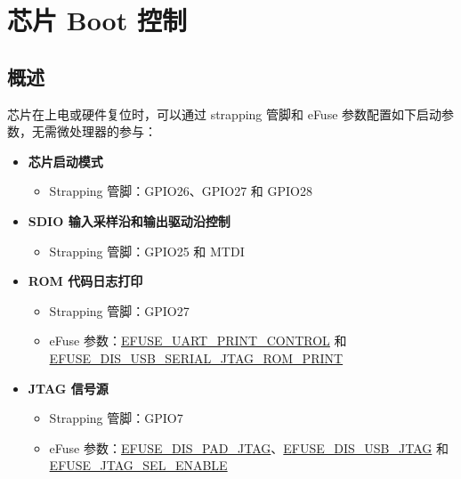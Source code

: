 \documentclass[main\_\_CN.tex]{subfiles}
\begin{document}

\ifglobal
\else
    \listoftodos
    {\let\clearpage\relax \listofdonetodos}
    \tableofcontents
\fi



\hypertarget{bootctrl}{}
\chapter{芯片 Boot 控制}
\label{mod:bootctrl}


\section{概述}

芯片在上电或硬件复位时，可以通过 strapping 管脚和 eFuse 参数配置如下启动参数，无需微处理器的参与：

\begin{itemize}
    \item \textbf{芯片启动模式}
    \begin{itemize}
        \item Strapping 管脚：GPIO26、GPIO27 和 GPIO28
    \end{itemize}
    \item \textbf{SDIO 输入采样沿和输出驱动沿控制}
        \begin{itemize}
            \item Strapping 管脚：GPIO25 和 MTDI
        \end{itemize}
    \item \textbf{ROM 代码日志打印}
        \begin{itemize}
            \item Strapping 管脚：GPIO27
            \item eFuse 参数：\hyperref[fielddesc:EFUSEUARTPRINTCONTROL]{EFUSE\_UART\_PRINT\_CONTROL} 和 \hyperref[fielddesc:EFUSEDISUSBSERIALJTAGROMPRINT]{EFUSE\_DIS\_USB\_SERIAL\_JTAG\_ROM\_PRINT}
        \end{itemize}
    \item \textbf{JTAG 信号源}
    \begin{itemize}
        \item Strapping 管脚：GPIO7
        \item eFuse 参数：\hyperref[fielddesc:EFUSEDISPADJTAG]{EFUSE\_DIS\_PAD\_JTAG}、\hyperref[fielddesc:EFUSEDISUSBJTAG]{EFUSE\_DIS\_USB\_JTAG} 和 \hyperref[fielddesc:EFUSEJTAGSELENABLE]{EFUSE\_JTAG\_SEL\_ENABLE}
    \end{itemize}
\end{itemize}
\end{document}
